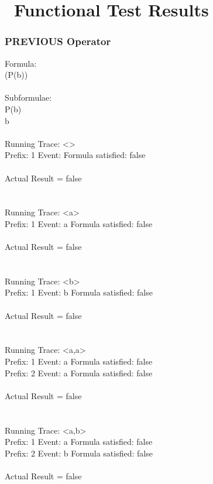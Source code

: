 \chapter{\RRH\ Functional Test Results}
\label{app:RRHFunctionalTestResults}

\subsection{PREVIOUS Operator}

Formula:\\
(P(b))\\
\\
Subformulae:\\
P(b)\\
b\\
\\
Running Trace: \textless \textgreater\\
  Prefix: 1 Event:  Formula satisfied: false\\
\\
Actual Result = false\\
\\
\\
Running Trace: \textless a\textgreater\\
  Prefix: 1 Event: a Formula satisfied: false\\
\\
Actual Result = false\\
\\
\\
Running Trace: \textless b\textgreater\\
  Prefix: 1 Event: b Formula satisfied: false\\
\\
Actual Result = false\\
\\
\\
Running Trace: \textless a,a\textgreater\\
  Prefix: 1 Event: a Formula satisfied: false\\
  Prefix: 2 Event: a Formula satisfied: false\\
\\
Actual Result = false\\
\\
\\
Running Trace: \textless a,b\textgreater\\
  Prefix: 1 Event: a Formula satisfied: false\\
  Prefix: 2 Event: b Formula satisfied: false\\
\\
Actual Result = false\\

